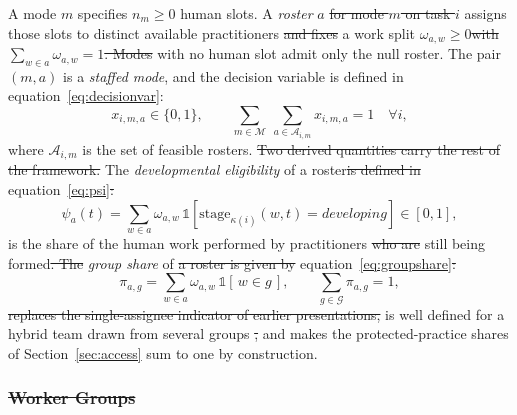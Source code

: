 \documentclass[utf8]{FrontiersinHarvard}
\providecommand{\DIFadd}[1]{{\protect\color{blue}\uwave{#1}}} %
\providecommand{\DIFdel}[1]{{\protect\color{red}\sout{#1}}}                      %
\providecommand{\DIFaddbegin}{} %
\providecommand{\DIFaddend}{} %
\providecommand{\DIFdelbegin}{} %
\providecommand{\DIFdelend}{} %
\begin{document}
	A mode $m$ specifies $n_m \geq 0$ human slots. A \textit{roster} $a$ \DIFdelbegin \DIFdel{for mode $m$ on task $i$ }\DIFdelend assigns those slots to distinct available practitioners \DIFdelbegin \DIFdel{and fixes }\DIFdelend \DIFaddbegin \DIFadd{with }\DIFaddend a work split $\omega_{a,w}\geq 0$\DIFdelbegin \DIFdel{with }\DIFdelend \DIFaddbegin \DIFadd{, }\DIFaddend $\sum_{w\in a}\omega_{a,w}=1$\DIFdelbegin \DIFdel{. Modes }\DIFdelend \DIFaddbegin \DIFadd{; modes }\DIFaddend with no human slot admit only the null roster. The pair $(m,a)$ is a \textit{staffed mode}, and the decision variable is defined in equation~\eqref{eq:decisionvar}:
	\begin{equation}
		x_{i,m,a}\in\{0,1\},\qquad
		\sum_{m\in\mathcal{M}}\ \sum_{a\in\mathcal{A}_{i,m}} x_{i,m,a}=1 \quad \forall i,
		\label{eq:decisionvar}
	\end{equation}
	where $\mathcal{A}_{i,m}$ is the set of feasible rosters. \DIFdelbegin \DIFdel{Two derived quantities carry the rest of the framework. }\DIFdelend The \textit{developmental eligibility} of a roster\DIFdelbegin \DIFdel{is defined in }\DIFdelend \DIFaddbegin \DIFadd{, }\DIFaddend equation~\eqref{eq:psi}\DIFdelbegin \DIFdel{:
	}\DIFdelend \DIFaddbegin \DIFadd{,
	}\DIFaddend \begin{equation}
		\psi_a(t)=\sum_{w\in a}\omega_{a,w}\,\mathbb{1}\!\left[\mathrm{stage}_{\kappa(i)}(w,t)=\textit{developing}\right] \in [0,1],
		\label{eq:psi}
	\end{equation}
	is the share of the human work performed by practitioners \DIFdelbegin \DIFdel{who are }\DIFdelend still being formed\DIFdelbegin \DIFdel{. The }\DIFdelend \DIFaddbegin \DIFadd{, and the }\DIFaddend \textit{group share} of \DIFdelbegin \DIFdel{a roster is given by }\DIFdelend equation~\eqref{eq:groupshare}\DIFdelbegin \DIFdel{:
	}\DIFdelend \DIFaddbegin \DIFadd{,
	}\DIFaddend \begin{equation}
		\pi_{a,g}=\sum_{w\in a}\omega_{a,w}\,\mathbb{1}[\,w \in g\,],\qquad \sum_{g\in\mathcal{G}}\pi_{a,g}=1,
		\label{eq:groupshare}
	\end{equation}
	\DIFdelbegin \DIFdel{replaces the single-assignee indicator of earlier presentations, }\DIFdelend is well defined for a hybrid team drawn from several groups \DIFdelbegin \DIFdel{, }\DIFdelend and makes the protected-practice shares of Section~\ref{sec:access} sum to one by construction. \DIFdelbegin %

\subsubsection*{\DIFdel{Worker Groups}}
\end{document}
